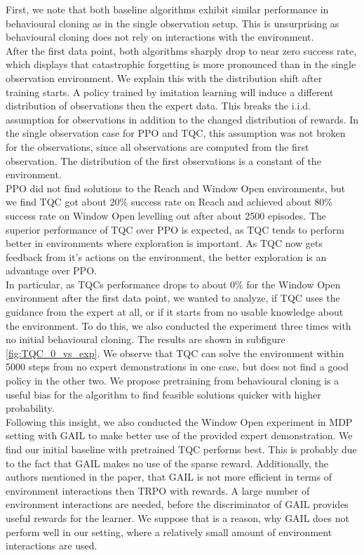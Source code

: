 First, we note that both baseline algorithms exhibit similar performance in behavioural cloning as in the single 
observation setup. This is unsurprising as behavioural cloning does not rely on interactions with the environment. \\

After the first data point, both algorithms sharply drop to near zero success rate, which displays that catastrophic forgetting is more 
pronounced than in the single observation environment. We explain this with the distribution shift after training starts. A policy trained by imitation learning 
will induce a different distribution of observations then the expert data. This breaks the i.i.d. assumption for observations in addition to the changed distribution of rewards. 
In the single observation case for PPO and TQC, this assumption was not broken for the observations, 
since all observations are computed from the first observation. The distribution of the first observations is a constant of the environment.\\

PPO did not find solutions to the Reach and Window Open environments, 
but we find TQC got about $20 \%$ success rate on Reach and achieved about $80 \%$ success rate on Window Open levelling out after about 2500 episodes. 
The superior performance of TQC over PPO is expected, as TQC tends to perform better in environments where exploration is important. As TQC now gets 
feedback from it's actions on the environment, the better exploration is an advantage over PPO.\\ 

In particular, as TQCs performance drops to about $0 \%$ for the Window Open 
environment after the first data point, we wanted to analyze, if TQC uses the guidance from the expert at all, or if it starts from 
no usable knowledge about the environment. To do this, we also conducted the experiment three times with no initial behavioural cloning. The results are shown in 
subfigure \ref{fig:TQC_0_vs_exp}. We observe that TQC can solve the environment within 5000 steps from no expert demonstrations in one case, but does not find a good policy in the other two. 
We propose pretraining from behavioural cloning is a useful bias for the algorithm to find feasible solutions quicker with higher probability.\\ 

Following this insight, 
we also conducted the Window Open experiment in MDP setting with GAIL to make better use of the provided expert demonstration. We find our initial 
baseline with pretrained TQC performs best. This is probably due to the fact that GAIL makes no use of the sparse reward. Additionally, 
the authors mentioned in the paper, that GAIL is not more efficient in terms of environment interactions then TRPO with rewards. A large number of 
environment interactions are needed, before the discriminator of GAIL provides useful rewards for the learner. We suppose that is a reason, why GAIL does not perform 
well in our setting, where a relatively small amount of environment interactions are used. \\

